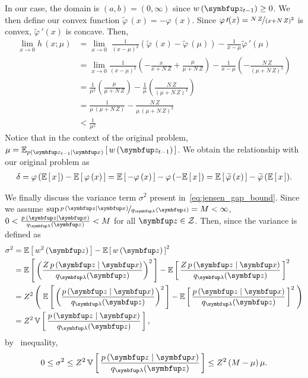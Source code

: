 \begin{proofEnd}
In our case, the domain is \((a,b) = (0, \infty)\) since \(w\,(\vz_{t-1}) \geq 0\).
We then define our convex function \(\widetilde{\varphi}\,(x) = - \varphi\,(x)\).
Since \(\varphi\,\prime(x) = \nicefrac{N\,Z}{{(x + N\,Z)}^2}\) is convex, \(\widetilde{\varphi}\,\prime(x)\) is concave. Then, 
\begin{align}
  \lim_{x \rightarrow 0} h\,(x; \mu)
  &=
  \lim_{x \rightarrow 0} \; \frac{1}{{(x - \mu)}^2} \left( \widetilde{\varphi}\,(x) - \widetilde{\varphi}\,(\mu) \right)
  - \frac{1}{ x - \mu }  \widetilde{\varphi}\,\prime(\mu)  \\
  &=
  \lim_{x \rightarrow 0} \frac{1}{{(x - \mu)}^2}
  \left(
  - \frac{x}{x + N\,Z} + \frac{\mu}{\mu + N\,Z}
  \right)
  -
  \frac{1}{x - \mu}
  \left(
  - \frac{N\,Z}{ {(\mu + N\,Z)}^2 }
  \right) \\
  &= \frac{1}{\mu^2} \left( \frac{\mu}{\mu + N\,Z} \right)
  - \frac{1}{\mu} \left( \frac{N\,Z}{{(\mu + N\,Z)}^2} \right) \\
  &= \frac{1}{ \mu \, (\mu + N\,Z) }
  - \frac{N\,Z}{ \mu \, {(\mu + N\,Z)}^2} \\
  &< \frac{1}{\mu^2}
\end{align}
Notice that in the context of the original problem, \(\mu = \Esub{p(\vz_{t-1}\mid\vx)}{ w\,(\vz_{t-1}) }\).
We obtain the relationship with our original problem as
\begin{align}
  \delta
  = \varphi\,(\mathbb{E}\left[\,x\,\right]) - \mathbb{E}\left[\,\varphi\,(x)\,\right]
  = \mathbb{E}\left[\,-\varphi\,(x)\,\right] - \varphi\,(-\mathbb{E}\left[\,x\,\right])
  = \mathbb{E}\left[\,\widetilde{\varphi}\,(x)\,\right] - \widetilde{\varphi}\,(\mathbb{E}\left[\,x\,\right]).
\end{align}

We finally discuss the variance term \(\sigma^2\) present in~\eqref{eq:jensen_gap_bound}.
Since we assume \(\sup \nicefrac{p\,(\vz\mid\vx)}{q_{\vlambda}(\vz)} = M < \infty \), \( 0 < \frac{p\,(\vz\mid\vx)}{q_{\vlambda}(\vz)} < M \) for all \(\vz \in \mathcal{Z}\).
Then, since the variance is defined as
\begin{align}
    \sigma^2 &= \E{w^2\,(\vz)} - {\E{w\,(\vz)}}^2 \\
             &= \E{ {\left( \frac{Z\,p\,(\vz\mid\vx)}{q_{\vlambda}(\vz) } \right)}^2 } - {\E{\frac{Z\,p\,(\vz\mid\vx)}{q_{\vlambda}(\vz) }}}^2 \\
             &= Z^2 \left(\; \E{ {\left( \frac{p\,(\vz\mid\vx)}{q_{\vlambda}(\vz) } \right)}^2 } - {\E{\frac{p\,(\vz\mid\vx)}{q_{\vlambda}(\vz) }}}^2 \;\right) \\
             &= Z^2 \, \V{ \frac{p\,(\vz\mid\vx)}{q_{\vlambda}(\vz) } } ,
\end{align}
by~\citet{bhatia_better_2000} inequality,
\begin{equation}
    0 \leq \sigma^2 
    \leq Z^2 \, \V{ \frac{p\,(\vz\mid\vx)}{q_{\vlambda}(\vz) } }
    \leq Z^2 \, (M - \mu)\,\mu.
\end{equation}


\end{proofEnd}

